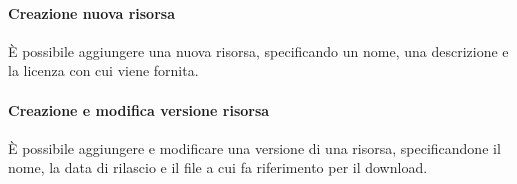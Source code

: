 \paragraph{Creazione nuova risorsa}
È possibile aggiungere una nuova risorsa, specificando un nome, una descrizione
e la licenza con cui viene fornita.

\paragraph{Creazione e modifica versione risorsa}
È possibile aggiungere e modificare una versione di una risorsa, specificandone
il nome, la data di rilascio e il file a cui fa riferimento per il download.